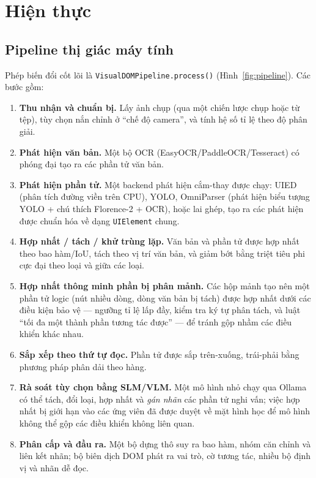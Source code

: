 \documentclass[11pt,a4paper]{article}
\newcommand{\code}[1]{\texttt{#1}}
\begin{document}
\section{Hiện thực}
\label{sec:impl}

\subsection{Pipeline thị giác máy tính}
Phép biến đổi cốt lõi là \code{VisualDOMPipeline.process()}
(Hình~\ref{fig:pipeline}). Các bước gồm:
\begin{enumerate}[leftmargin=1.6em]
  \item \textbf{Thu nhận và chuẩn bị.} Lấy ảnh chụp (qua một chiến lược chụp hoặc từ
        tệp), tùy chọn nắn chỉnh ở ``chế độ camera'', và tính hệ số tỉ lệ theo độ
        phân giải.
  \item \textbf{Phát hiện văn bản.} Một bộ OCR (EasyOCR/PaddleOCR/Tesseract) có
        phóng đại tạo ra các phần tử văn bản.
  \item \textbf{Phát hiện phần tử.} Một backend phát hiện cắm-thay được chạy: UIED
        (phân tích đường viền trên CPU), YOLO, OmniParser (phát hiện biểu tượng YOLO
        + chú thích Florence-2 + OCR), hoặc lai ghép, tạo ra các phát hiện được
        chuẩn hóa về dạng \code{UIElement} chung.
  \item \textbf{Hợp nhất / tách / khử trùng lặp.} Văn bản và phần tử được hợp nhất
        theo bao hàm/IoU, tách theo vị trí văn bản, và giảm bớt bằng triệt tiêu
        phi cực đại theo loại và giữa các loại.
  \item \textbf{Hợp nhất thông minh phần bị phân mảnh.} Các hộp mảnh tạo nên một
        phần tử logic (nút nhiều dòng, dòng văn bản bị tách) được hợp nhất dưới các
        điều kiện bảo vệ --- ngưỡng tỉ lệ lấp đầy, kiểm tra ký tự phân tách, và luật
        ``tối đa một thành phần tương tác được'' --- để tránh gộp nhầm các điều
        khiển khác nhau.
  \item \textbf{Sắp xếp theo thứ tự đọc.} Phần tử được sắp trên-xuống, trái-phải
        bằng phương pháp phân dải theo hàng.
  \item \textbf{Rà soát tùy chọn bằng SLM/VLM.} Một mô hình nhỏ chạy qua Ollama có
        thể tách, đổi loại, hợp nhất và \emph{gán nhãn} các phần tử nghi vấn; việc
        hợp nhất bị giới hạn vào các ứng viên đã được duyệt về mặt hình học để mô
        hình không thể gộp các điều khiển không liên quan.
  \item \textbf{Phân cấp và đầu ra.} Một bộ dựng thô suy ra bao hàm, nhóm căn chỉnh
        và liên kết nhãn; bộ biên dịch DOM phát ra vai trò, cờ tương tác, nhiều bộ
        định vị và nhãn dễ đọc.
\end{enumerate}
\end{document}
